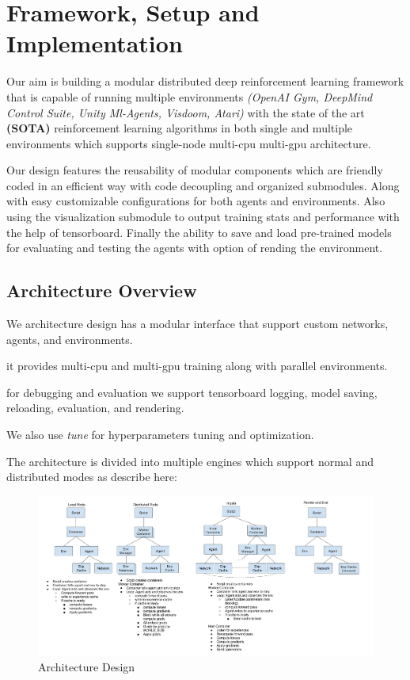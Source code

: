 
\chapter{Framework, Setup and Implementation}\label{chapter:experiments2}
Our aim is building a modular distributed deep reinforcement learning framework that is capable of running multiple environments \textit{(OpenAI Gym, DeepMind Control Suite, Unity Ml-Agents, Visdoom, Atari)} with the state of the art \textbf{(SOTA)} reinforcement learning algorithms in both single and multiple environments which supports single-node multi-cpu multi-gpu architecture.

Our design features the reusability of modular components which are friendly coded in an efficient way with code decoupling and organized submodules.
Along with easy customizable configurations for both agents and environments. Also using the visualization submodule to output training stats and performance with the help of tensorboard. Finally the ability to save and load pre-trained models for evaluating and testing the agents with option of rending the environment.

\section{Architecture Overview}
We architecture design has a modular interface that support custom networks, agents, and environments. 

it provides multi-cpu and multi-gpu training along with parallel environments. 

for debugging and evaluation we support tensorboard logging, model saving, reloading, evaluation, and rendering. 

We also use \textit{tune} for hyperparameters tuning and optimization.

The architecture is divided into multiple engines which support normal and distributed modes as describe here:

\begin{figure}[H]%
  \centering
  \includegraphics[width=\linewidth]{figures/architecture.png}%
  \caption{Architecture Design}%
  \label{fig:custom-reacher-xml}%
\end{figure}

